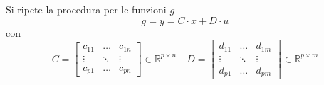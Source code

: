 Si ripete la procedura per le funzioni $g$
$$
g = y = C\cdot x + D\cdot u
$$
con
$$
C = \begin{bmatrix}
c_{11} & \dots & c_{1n} \\
\vdots & \ddots & \vdots \\
c_{p1} & \dots & c_{pn}
\end{bmatrix} \in \mathbb{R}^{p\times n} \quad
D = \begin{bmatrix}
d_{11} & \dots & d_{1m} \\
\vdots & \ddots & \vdots \\
d_{p1} & \dots & d_{pm}
\end{bmatrix} \in \mathbb{R}^{p\times m}
$$
